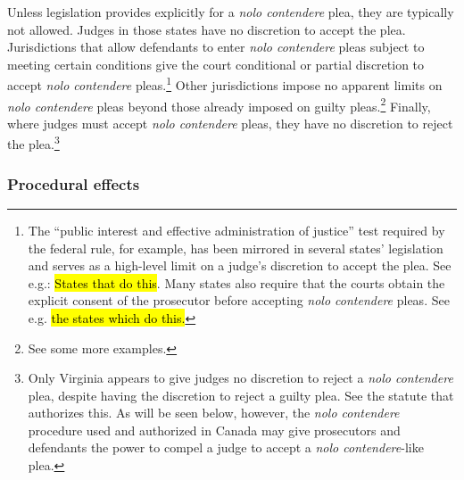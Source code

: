 Unless legislation provides explicitly for a \textit{nolo contendere} plea, they are typically not allowed. Judges in those states have no discretion to accept the plea. Jurisdictions that allow defendants to enter \textit{nolo contendere} pleas subject to meeting certain conditions give the court conditional or partial discretion to accept \textit{nolo contendere} pleas.\footnote{The ``public interest and effective administration of justice” test required by the federal rule, for example, has been mirrored in several states' legislation and serves as a high-level limit on a judge's discretion to accept the plea. See e.g.: \hl{States that do this}. Many states also require that the courts obtain the explicit consent of the prosecutor before accepting \textit{nolo contendere} pleas. See e.g. \hl{the states which do this.}} Other jurisdictions impose no apparent limits on \textit{nolo contendere} pleas beyond those already imposed on guilty pleas.\footnote{See some more examples.} Finally, where judges must accept \textit{nolo contendere} pleas, they have no discretion to reject the plea.\footnote{Only Virginia appears to give judges no discretion to reject a \textit{nolo contendere} plea, despite having the discretion to reject a guilty plea. See the statute that authorizes this. As will be seen below, however, the \textit{nolo contendere} procedure used and authorized in Canada may give prosecutors and defendants the power to compel a judge to accept a \textit{nolo contendere}-like plea.}

\subsubsection{Procedural effects}

